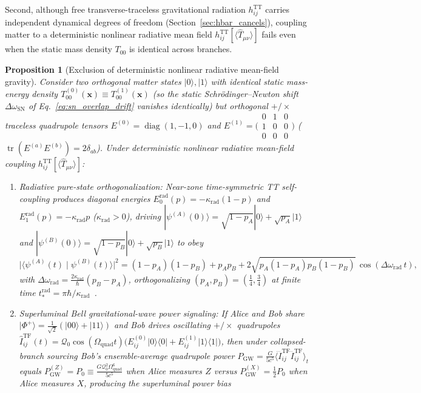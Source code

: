 \documentclass[aps,prd,onecolumn,tightenlines,nofootinbib,notitlepage,11pt,floatfix]{revtex4-2}
\theoremstyle{indentedtheorem}
\newtheorem{proposition}{Proposition}
\begin{document}
Second, although free transverse-traceless gravitational radiation $h_{ij}^\text{TT}$ carries independent dynamical degrees of freedom (Section~\ref{sec:hbar_cancels}), coupling matter to a deterministic nonlinear radiative mean field $h_{ij}^\text{TT}[\langle\hat{T}_{\mu\nu}\rangle]$ fails even when the static mass density $T_{00}$ is identical across branches.

\begin{proposition}[Exclusion of deterministic nonlinear radiative mean-field gravity]\label{prop:rad_meanfield_signaling}
Consider two orthogonal matter states $|0\rangle, |1\rangle$ with identical static mass-energy density $T_{00}^{(0)}(\mathbf{x})\equiv T_{00}^{(1)}(\mathbf{x})$ (so the static Schr\"odinger--Newton shift $\Delta\omega_\text{SN}$ of Eq.~\eqref{eq:sn_overlap_drift} vanishes identically) but orthogonal $+/\times$ traceless quadrupole tensors $E^{(0)}=\operatorname{diag}(1,-1,0)$ and $E^{(1)}=\bigl(\begin{smallmatrix}0&1&0\\1&0&0\\0&0&0\end{smallmatrix}\bigr)$ ($\operatorname{tr}(E^{(a)}E^{(b)})=2\delta_{ab}$). Under deterministic nonlinear radiative mean-field coupling $h_{ij}^\text{TT}[\langle\hat{T}_{\mu\nu}\rangle]$:
\begin{enumerate}[label=(\roman*)]
\item \emph{Radiative pure-state orthogonalization:} Near-zone time-symmetric TT self-coupling produces diagonal energies $E_0^\text{rad}(p)=-\kappa_\text{rad}(1-p)$ and $E_1^\text{rad}(p)=-\kappa_\text{rad}p$ ($\kappa_\text{rad}>0$), driving $|\psi^{(A)}(0)\rangle = \sqrt{1-p_A}|0\rangle + \sqrt{p_A}|1\rangle$ and $|\psi^{(B)}(0)\rangle = \sqrt{1-p_B}|0\rangle + \sqrt{p_B}|1\rangle$ to obey
\begin{equation}
    \big|\langle\psi^{(A)}(t)\mid\psi^{(B)}(t)\rangle\big|^2 = (1-p_A)(1-p_B) + p_A p_B + 2\sqrt{p_A(1-p_A)p_B(1-p_B)}\,\cos(\Delta\omega_\text{rad}\,t) ,
    \label{eq:rad_overlap_drift}
\end{equation}
with $\Delta\omega_\text{rad} = \frac{2\kappa_\text{rad}}{\hbar}(p_B-p_A)$, orthogonalizing $(p_A,p_B)=(\tfrac{1}{4},\tfrac{3}{4})$ at finite time $t_*^\text{rad}=\pi\hbar/\kappa_\text{rad}$~\citep{Polchinski1991}.
\item \emph{Superluminal Bell gravitational-wave power signaling:} If Alice and Bob share $|\Phi^+\rangle=\tfrac{1}{\sqrt{2}}(|00\rangle+|11\rangle)$ and Bob drives oscillating $+/\times$ quadrupoles $\hat{I}_{ij}^\text{TF}(t) = \mathcal{Q}_0\cos(\Omega_\text{quad}t)\big(E_{ij}^{(0)}|0\rangle\langle 0| + E_{ij}^{(1)}|1\rangle\langle 1|\big)$, then under collapsed-branch sourcing Bob's ensemble-average quadrupole power $P_\text{GW} = \frac{G}{5c^5}\langle\dddot{I}_{ij}^\text{TF}\dddot{I}_{ij}^\text{TF}\rangle_t$ equals $P_\text{GW}^{(Z)} = P_0 \equiv \frac{G\mathcal{Q}_0^2\Omega_\text{quad}^6}{5c^5}$ when Alice measures $Z$ versus $P_\text{GW}^{(X)}=\tfrac{1}{2}P_0$ when Alice measures $X$, producing the superluminal power bias

\end{enumerate}
\end{proposition}
\end{document}
